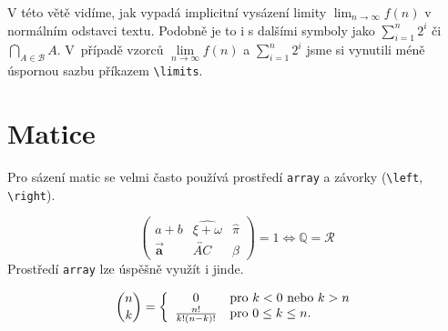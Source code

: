 \documentclass[a4paper, 11pt, twocolumn]{article}
\begin{document}
        V této větě vidíme, jak vypadá implicitní vysázení limity $\lim_{n\to\infty} f(n)$ v normálním odstavci textu. Podobně je to i s dalšími symboly jako $\sum_{i=1}^{n} 2^{i}$ či $\bigcap_{A\in \mathcal{B}} A$. V~pří\-padě vzorců $\lim\limits_{n\to\infty} f(n)$ a $\sum\limits_{i=1}^{n} 2^{i}$ jsme si vynutili méně úspornou sazbu příkazem \verb!\limits!.
        
    \section{Matice}
        Pro sázení matic se velmi často používá prostředí \verb!array! a závorky (\verb!\left!, \verb!\right!).
        
        $$ \left(
        \begin{array}{ccc}
             a+b & \widehat{\xi + \omega} & \hat{\pi} 
             \\
            \vec{\textbf{a}} & \overleftrightarrow{AC} & \beta
        \end{array}
        \right) = 1  \Longleftrightarrow \mathbb{Q} = \mathcal{R}$$
        Prostředí \verb!array! lze úspěšně využít i jinde.
        
        $$\binom{n}{k}
        = 
        \left\{ \begin{array}{cl}
             0 & \textnormal{pro $k < 0$ nebo $k > n$}\\
             \frac{n!}{k!(n-k)!} & \textnormal{pro $0 \leq k \leq n$.}
        \end{array}\right.
        $$


        
\end{document}
